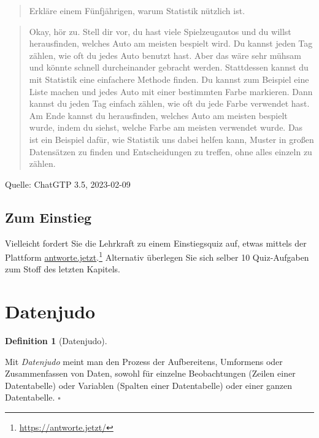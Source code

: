 \documentclass[
  a4paper,
]{scrbook}
\theoremstyle{definition}
\theoremstyle{definition}
\newtheorem{definition}{Definition}[chapter]
\theoremstyle{definition}
\theoremstyle{remark}
\begin{document}
\begin{quote}
{} Erkläre einem Fünfjährigen, warum Statistik nützlich
ist.
\end{quote}

\begin{quote}
{} Okay, hör zu. Stell dir vor, du hast viele
Spielzeugautos und du willst herausfinden, welches Auto am meisten
bespielt wird. Du kannst jeden Tag zählen, wie oft du jedes Auto benutzt
hast. Aber das wäre sehr mühsam und könnte schnell durcheinander
gebracht werden. Stattdessen kannst du mit Statistik eine einfachere
Methode finden. Du kannst zum Beispiel eine Liste machen und jedes Auto
mit einer bestimmten Farbe markieren. Dann kannst du jeden Tag einfach
zählen, wie oft du jede Farbe verwendet hast. Am Ende kannst du
herausfinden, welches Auto am meisten bespielt wurde, indem du siehst,
welche Farbe am meisten verwendet wurde. Das ist ein Beispiel dafür, wie
Statistik uns dabei helfen kann, Muster in großen Datensätzen zu finden
und Entscheidungen zu treffen, ohne alles einzeln zu zählen.
\end{quote}

Quelle: ChatGTP 3.5, 2023-02-09

\subsection{Zum Einstieg}\label{zum-einstieg}

Vielleicht fordert Sie die Lehrkraft zu einem Einstiegsquiz auf, etwas
mittels der Plattform
\href{https://antworte.jetzt/}{antworte.jetzt}.\footnote{\url{https://antworte.jetzt/}}
Alternativ überlegen Sie sich selber 10 Quiz-Aufgaben zum Stoff des
letzten Kapitels.

\section{Datenjudo}\label{datenjudo}

\begin{definition}[Datenjudo]\protect\hypertarget{def-datenjudo}{}\label{def-datenjudo}

Mit \emph{Datenjudo} meint man den Prozess der Aufbereitens, Umformens
oder Zusammenfassen von Daten, sowohl für einzelne Beobachtungen (Zeilen
einer Datentabelle) oder Variablen (Spalten einer Datentabelle) oder
einer ganzen Datentabelle. \(\square\)

\end{definition}
\end{document}
